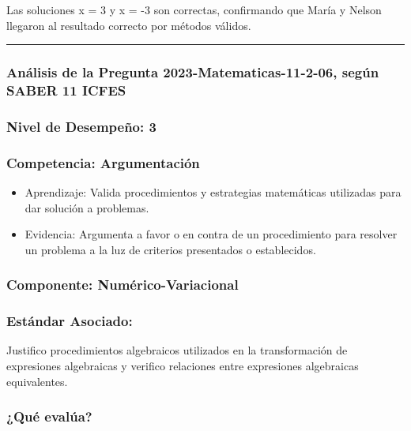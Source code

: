 \documentclass[
]{article}
\providecommand{\tightlist}{%
  \setlength{\itemsep}{0pt}\setlength{\parskip}{0pt}}
\begin{document}
Las soluciones x = 3 y x = -3 son correctas, confirmando que María y
Nelson llegaron al resultado correcto por métodos válidos.

\begin{center}\rule{0.5\linewidth}{0.5pt}\end{center}

\subsubsection{Análisis de la Pregunta 2023-Matematicas-11-2-06, según
SABER 11
ICFES}\label{anuxe1lisis-de-la-pregunta-2023-matematicas-11-2-06-seguxfan-saber-11-icfes}

\subsubsection{Nivel de Desempeño: 3}\label{nivel-de-desempeuxf1o-3}

\subsubsection{Competencia:
Argumentación}\label{competencia-argumentaciuxf3n}

\begin{itemize}
\tightlist
\item
  Aprendizaje: Valida procedimientos y estrategias matemáticas
  utilizadas para dar solución a problemas.
\item
  Evidencia: Argumenta a favor o en contra de un procedimiento para
  resolver un problema a la luz de criterios presentados o establecidos.
\end{itemize}

\subsubsection{Componente:
Numérico-Variacional}\label{componente-numuxe9rico-variacional}

\subsubsection{Estándar Asociado:}\label{estuxe1ndar-asociado-1}

Justifico procedimientos algebraicos utilizados en la transformación de
expresiones algebraicas y verifico relaciones entre expresiones
algebraicas equivalentes.

\subsubsection{¿Qué evalúa?}\label{quuxe9-evaluxfaa-1}
\end{document}
